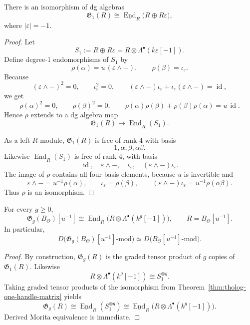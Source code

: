 \begin{theorem}
There is an isomorphism of dg algebras
\[
\mathfrak{G}_{1}(R)\cong \underline{\operatorname{End}}_{R}
\big(R\oplus R\varepsilon\big),
\]
where \(|\varepsilon|=-1\).
\end{theorem}

\begin{proof}
Let
\[
S_{1}:=R\oplus R\varepsilon=R\otimes \Lambda^{\bullet}(k\varepsilon[-1]).
\]
Define degree-\(1\) endomorphisms of \(S_{1}\) by
\[
\rho(\alpha)=u\,(\varepsilon\wedge -),\qquad
\rho(\beta)=\iota_{\varepsilon}.
\]
Because
\[
(\varepsilon\wedge -)^{2}=0,\qquad \iota_{\varepsilon}^{2}=0,\qquad
(\varepsilon\wedge -)\iota_{\varepsilon}+\iota_{\varepsilon}(\varepsilon\wedge -)=\operatorname{id},
\]
we get
\[
\rho(\alpha)^{2}=0,\qquad
\rho(\beta)^{2}=0,\qquad
\rho(\alpha)\rho(\beta)+\rho(\beta)\rho(\alpha)=u\,\operatorname{id}.
\]
Hence \(\rho\) extends to a dg algebra map
\[
\mathfrak{G}_{1}(R)\longrightarrow \underline{\operatorname{End}}_{R}(S_{1}).
\]

As a left \(R\)-module, \(\mathfrak{G}_{1}(R)\) is free of rank \(4\) with basis
\[
1,\alpha,\beta,\alpha\beta.
\]
Likewise \(\underline{\operatorname{End}}_{R}(S_{1})\) is free of rank \(4\), with basis
\[
\operatorname{id},\quad \varepsilon\wedge -,\quad \iota_{\varepsilon},\quad
(\varepsilon\wedge -)\iota_{\varepsilon}.
\]
The image of \(\rho\) contains all four basis elements, because \(u\) is invertible and
\[
\varepsilon\wedge - = u^{-1}\rho(\alpha),\qquad
\iota_{\varepsilon}=\rho(\beta),\qquad
(\varepsilon\wedge -)\iota_{\varepsilon}=u^{-1}\rho(\alpha\beta).
\]
Thus \(\rho\) is an isomorphism.
\end{proof}

\begin{theorem}
For every \(g\geq 0\),
\[
\mathfrak{G}_{g}(B_{\Theta})[u^{-1}]
\cong
\underline{\operatorname{End}}_{R}
\Big(R\otimes \Lambda^{\bullet}(k^{g}[-1])\Big),
\qquad
R=B_{\Theta}[u^{-1}].
\]
In particular,
\[
D\!\big(\mathfrak{G}_{g}(B_{\Theta})[u^{-1}]\text{-mod}\big)
\simeq
D\!\big(B_{\Theta}[u^{-1}]\text{-mod}\big).
\]
\end{theorem}

\begin{proof}
By construction, \(\mathfrak{G}_{g}(R)\) is the graded tensor product of \(g\) copies of \(\mathfrak{G}_{1}(R)\).
Likewise
\[
R\otimes \Lambda^{\bullet}(k^{g}[-1])
\cong
S_{1}^{\otimes g}.
\]
Taking graded tensor products of the isomorphism from Theorem~\ref{thm:tholog-one-handle-matrix} yields
\[
\mathfrak{G}_{g}(R)\cong
\underline{\operatorname{End}}_{R}(S_{1}^{\otimes g})
\cong
\underline{\operatorname{End}}_{R}
\Big(R\otimes \Lambda^{\bullet}(k^{g}[-1])\Big).
\]
Derived Morita equivalence is immediate.
\end{proof}

